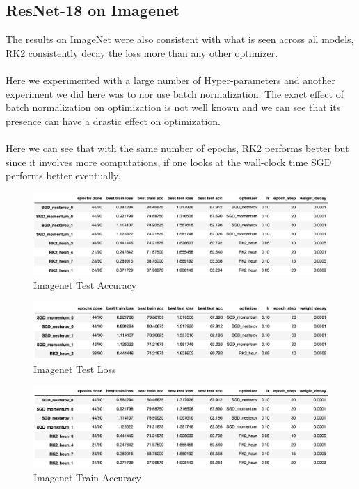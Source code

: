 \subsection*{ResNet-18 on Imagenet}
The results on ImageNet were also consistent with what
is seen across all models, RK2 consistently decay the
loss more than any other optimizer.
\\
\\
Here we experimented with a large number of Hyper-parameters
and another experiment we did here was to nor use batch
normalization. The exact effect of batch normalization on
optimization is not well known and we can see that its
presence can have a drastic effect on optimization.
\\
\\
Here we can see that with the same number of epochs, RK2
performs better but since it involves more computations,
if one looks at the wall-clock time SGD performs better
eventually.
\begin{figure}[htb]
\includegraphics[scale=0.5]{imagenet_resnet18_test_acc.png}
\caption{Imagenet Test Accuracy}
\end{figure}

\begin{figure}[htb]
\includegraphics[scale=0.5]{imagenet_resnet18_test_loss.png}
\caption{Imagenet Test Loss}
\end{figure}

\begin{figure}[htb]
\includegraphics[scale=0.5]{imagenet_resnet18_train_acc.png}
\caption{Imagenet Train Accuracy}
\end{figure}

